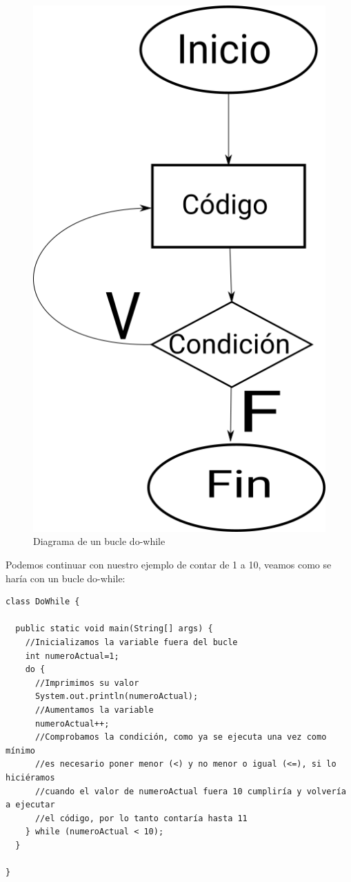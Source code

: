 \documentclass[11pt]{article}
\begin{document}
\begin{figure}[htbp]
\centering
\includegraphics[width=.9\linewidth]{do-while.png}
\caption{Diagrama de un bucle do-while}
\end{figure}

Podemos continuar con nuestro ejemplo de contar de 1 a 10, veamos como se haría con un bucle do-while:

\begin{verbatim}
class DoWhile {

  public static void main(String[] args) {
    //Inicializamos la variable fuera del bucle
    int numeroActual=1;
    do {
      //Imprimimos su valor
      System.out.println(numeroActual);
      //Aumentamos la variable
      numeroActual++;
      //Comprobamos la condición, como ya se ejecuta una vez como mínimo
      //es necesario poner menor (<) y no menor o igual (<=), si lo hiciéramos
      //cuando el valor de numeroActual fuera 10 cumpliría y volvería a ejecutar
      //el código, por lo tanto contaría hasta 11
    } while (numeroActual < 10);
  }

}
\end{verbatim}
\end{document}
